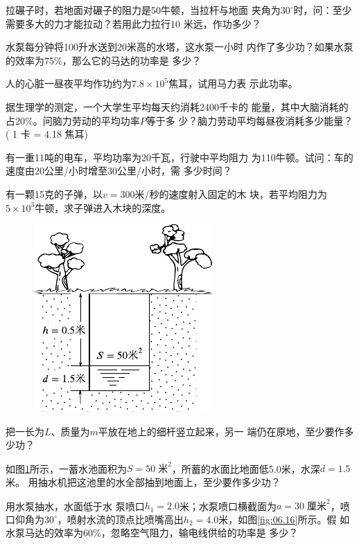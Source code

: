 \begin{exercises}

\exercise 拉碾子时，若地面对碾子的阻力是50牛顿，当拉杆与地面
夹角为$ 30 ^ { \circ } $时，问：至少需要多大的力才能拉动？若用此力拉行10
米远，作功多少？

\exercise 水泵每分钟将100升水送到20米高的水塔，这水泵一小时
内作了多少功？如果水泵的效率为75\%，那么它的马达的功率是
多少？

\exercise 人的心脏一昼夜平均作功约为$ 7.8 \times 10 ^ 5 $焦耳，试用马力表
示此功率。

\exercise 据生理学的测定，一个大学生平均每天约消耗2400千卡的
能量，其中大脑消耗的占20\%。问脑力劳动的平均功率$ P $等于多
少？脑力劳动平均每昼夜消耗多少能量？( 1 卡 = 4.18 焦耳)

\clearpage
\exercise 有一重11吨的电车，平均功率为20千瓦，行驶中平均阻力
为110牛顿。试问：车的速度由20公里/小时增至30公里/小时，需
多少时间？

\exercise 有一颗15克的子弹，以$ v = 300 $米/秒的速度射入固定的木
块，若平均阻力为$ 5 \times 10 ^ { 3 } $牛顿，求子弹进入木块的深度。

\begin{figure}
    \vspace{-1em}
  \centering
  \includegraphics{figure/fig06.15}
  \caption{}
  \label{fig:06.15}
\end{figure}
\exercise 把一长为$ L $、质量为$ m $平放在地上的细杆竖立起来，另一
端仍在原地，至少要作多少功？

\exercise 如图\ref{fig:06.15}\;所示，一蓄水池面积为$ S = 50 \;\text{米} ^ 2 $，所蓄的水面比地面低5.0米，水深$ d=1.5 $米。
用抽水机把这池里的水全部抽到地面上，至少要作多少功？

\exercise 用水泵抽水，水面低于水
泵喷口$ h _ { 1 } = 2.0 $米；水泵喷口横截面为$ a = 3 0 \;\text{厘米} ^ 2 $，喷口仰角为$
  30 ^ { \circ } $，喷射水流的顶点比喷嘴高出$ h _ { 2 } = 4.0 $米，如图\ref{fig:06.16}\;所示。假
如水泵马达的效率为60\%，忽略空气阻力，输电线供给的功率是
多少？


\end{exercises}
